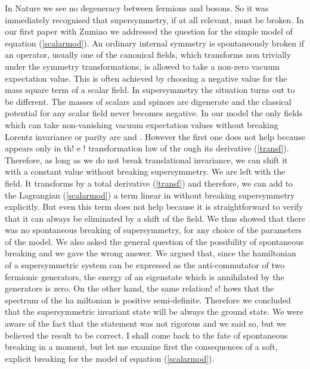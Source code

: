 \documentclass[a4paper,11pt]{article}
\begin{document}
In Nature we see no degeneracy between fermions and bosons. So it was immediately recognised that supersymmetry, if at all relevant, must be broken. In our first paper with Zumino \cite{IZ} we addressed the question for the simple model of equation (\ref{scalarmod}). An ordinary internal symmetry is spontaneously broken if an operator, usually one of the canonical fields, which transforms non trivially under the symmetry transformations, is allowed to take a non-zero vacuum expectation value. This is often  achieved by choosing a negative value for the mass square term of a scalar field.  In supersymmetry the situation turns out to be different. The masses of scalars and spinors are digenerate and the classical potential for any scalar field never becomes negative. In our model the only fields which can take non-vanishing vacuum expectation values without breaking Lorentz invariance or parity are \coordHE{} and \coordHE{}. However the first one does not help because \coordHE{} appears only in th!
e !
transformation law of \myHighlight{$\psi$}\coordHE{} thr
ough its derivative (\ref{transf}). Therefore, as long as we do not break translational invariance, we can shift it with a constant value without breaking supersymmetry. We are left with the \coordHE{} field. It transforms by a total derivative (\ref{transf}) and therefore,  we can add to the Lagrangian (\ref{scalarmod}) a term linear in \coordHE{} without breaking supersymmetry explicitly. But even this term does not help because it is straightforward to verify that it can always be eliminated by a shift of the \coordHE{} field. We thus showed that there was no spontaneous breaking of supersymmetry, for any choice of the parameters of the model. We also asked the general question of the  possibility of spontaneous breaking and we gave the wrong answer. We argued that, since the hamiltonian of a supersymmetric system can be expressed as the anti-commutator of two fermionic generators, the energy of an eigenstate which is annihilated by the generators is zero. On the other hand, the same relation!
 s!
hows that the spectrum of the ha
miltonian is positive semi-definite. Therefore we concluded that the supersymmetric invariant state will be always the ground state. We were aware of the fact that the statement was not rigorous and we said so, but we believed the result to be correct. I shall come back to the fate of spontaneous breaking in a moment, but let me examine first the consequences of a soft, explicit breaking for the model of equation (\ref{scalarmod}).
\end{document}
